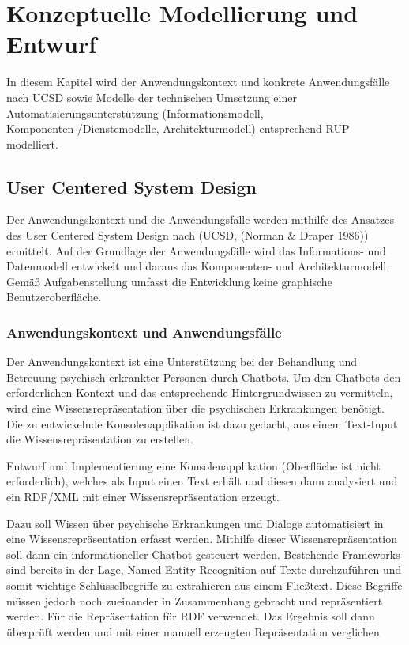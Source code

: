 \chapter{Konzeptuelle Modellierung und Entwurf}
\label{ch:modellierung}
In diesem Kapitel wird der Anwendungskontext und konkrete Anwendungsfälle nach UCSD sowie Modelle der technischen Umsetzung einer Automatisierungsunterstützung (Informationsmodell, Komponenten-/Dienstemodelle, Architekturmodell) entsprechend RUP modelliert.

\section{User Centered System Design }

Der Anwendungskontext und die Anwendungsfälle werden mithilfe des Ansatzes des User Centered System Design nach (UCSD, (Norman & Draper 1986)) ermittelt. Auf der Grundlage der Anwendungsfälle wird das Informations- und Datenmodell entwickelt und daraus das Komponenten- und Architekturmodell.
Gemäß Aufgabenstellung umfasst die Entwicklung keine graphische Benutzeroberfläche.

\subsection{Anwendungskontext und Anwendungsfälle}

Der Anwendungskontext ist eine Unterstützung bei der Behandlung und Betreuung psychisch erkrankter Personen durch Chatbots. Um den Chatbots den erforderlichen Kontext und das entsprechende Hintergrundwissen zu vermitteln, wird eine Wissensrepräsentation über die psychischen Erkrankungen benötigt. Die zu entwickelnde Konsolenapplikation ist dazu gedacht, aus einem Text-Input die Wissensrepräsentation zu erstellen.



Entwurf und Implementierung eine Konsolenapplikation (Oberfläche ist nicht erforderlich),
welches als Input einen Text erhält und diesen dann analysiert und ein RDF/XML mit einer
Wissensrepräsentation erzeugt.

Dazu soll Wissen über psychische Erkrankungen
und Dialoge automatisiert in eine Wissensrepräsentation erfasst werden. Mithilfe dieser
Wissensrepräsentation soll dann ein informationeller Chatbot gesteuert werden. Bestehende
Frameworks sind bereits in der Lage, Named Entity Recognition auf Texte durchzuführen und somit
wichtige Schlüsselbegriffe zu extrahieren aus einem Fließtext. Diese Begriffe müssen jedoch noch
zueinander in Zusammenhang gebracht und repräsentiert werden. Für die Repräsentation für RDF
verwendet. Das Ergebnis soll dann überprüft werden und mit einer manuell erzeugten Repräsentation
verglichen

